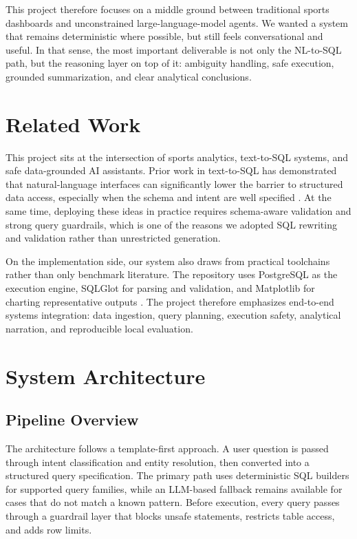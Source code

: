 \documentclass[11pt]{article}
\begin{document}
This project therefore focuses on a middle ground between traditional sports dashboards and unconstrained large-language-model agents. We wanted a system that remains deterministic where possible, but still feels conversational and useful. In that sense, the most important deliverable is not only the NL-to-SQL path, but the reasoning layer on top of it: ambiguity handling, safe execution, grounded summarization, and clear analytical conclusions.

\section{Related Work}
This project sits at the intersection of sports analytics, text-to-SQL systems, and safe data-grounded AI assistants. Prior work in text-to-SQL has demonstrated that natural-language interfaces can significantly lower the barrier to structured data access, especially when the schema and intent are well specified \cite{spider}. At the same time, deploying these ideas in practice requires schema-aware validation and strong query guardrails, which is one of the reasons we adopted SQL rewriting and validation rather than unrestricted generation.

On the implementation side, our system also draws from practical toolchains rather than only benchmark literature. The repository uses PostgreSQL as the execution engine, SQLGlot for parsing and validation, and Matplotlib for charting representative outputs \cite{sqlglot,postgresql,matplotlib}. The project therefore emphasizes end-to-end systems integration: data ingestion, query planning, execution safety, analytical narration, and reproducible local evaluation.

\section{System Architecture}
\subsection{Pipeline Overview}
The architecture follows a template-first approach. A user question is passed through intent classification and entity resolution, then converted into a structured query specification. The primary path uses deterministic SQL builders for supported query families, while an LLM-based fallback remains available for cases that do not match a known pattern. Before execution, every query passes through a guardrail layer that blocks unsafe statements, restricts table access, and adds row limits.
\end{document}
